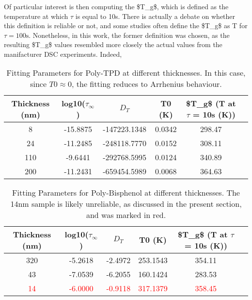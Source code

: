 Of particular interest is then computing the \ac{$T_g$}, which is defined as the temperature at which $\tau$ is equal to 10s.  There is actually a debate on whether this definition is reliable or not, and some studies often define the \ac{$T_g$} as T for $\tau = \text{100s}$. Nonetheless, in this work, the former definition was chosen, as the resulting \ac{$T_g$} values resembled more closely the actual values from the manifacturer \ac{DSC} experiments. %
Indeed, %


\begin{table}[h]
    \caption{Fitting Parameters for Poly-TPD at different thicknesses. In this case, since $T0 \approx 0$, the fitting reduces to Arrhenius behaviour.}
    \label{tab:fitting-parameters-ptpd}
    \begin{center}
    \begin{tabular}{@{}cccccc@{}}
    \toprule
    Thickness (nm) & log10($\tau_\infty$) & $D_T$ & T0 (K) & \ac{$T_g$} (T at $\tau$ = 10s (K)) \\ \midrule
    8   & -15.8875 & -147223.1348 & 0.0342 & 298.47 \\
    24  & -11.2485 & -248118.7770 & 0.0152 & 308.11 \\
    110 & -9.6441 & -292768.5995 & 0.0124 & 340.89 \\
    200 & -11.2431 & -659454.5989 & 0.0068 & 364.63 \\
    \bottomrule
    \end{tabular}
    \end{center}
\end{table}



\begin{table}[h]
    \caption{Fitting Parameters for Poly-Bisphenol at different thicknesses. The 14nm sample is likely unreliable, as discussed in the present section, and was marked in red.}
    \label{tab:fitting-parameters-bisphenol}
    \begin{center}
    \begin{tabular}{@{}cccccc@{}}
    \toprule
    Thickness (nm) & log10($\tau_\infty$) & $D_T$ & T0 (K) & \ac{$T_g$} (T at $\tau$ = 10s (K)) \\ \midrule
    320 & -5.2618 & -2.4972 & 253.1543 & 354.11 \\
    43  & -7.0539 & -6.2055 & 160.1424 & 283.53 \\
    \textcolor{red}{14}  & \textcolor{red}{-6.0000} & \textcolor{red}{-0.9118} & \textcolor{red}{317.1379} & \textcolor{red}{358.45} \\ %
    \bottomrule
    \end{tabular}
    \end{center}
\end{table}


